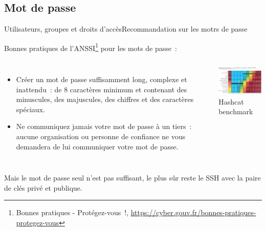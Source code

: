 \documentclass{beamer}
\begin{document}
    \subsection{Mot de passe}\label{subsec:password}
    \begin{frame}{Utilisateurs, groupes et droits d'accès}{Recommandation sur les motrs de passe}
        \begin{footnotesize}
            Bonnes pratiques de l'ANSSI\footnote{Bonnes pratiques - Protégez-vous~!, \url{https://cyber.gouv.fr/bonnes-pratiques-protegez-vous}} pour les mots de passe~:
            \begin{columns}
                \begin{itemize}
                    \item Créer un mot de passe suffisamment long, complexe et inattendu~:
                    de 8 caractères minimum et contenant des minuscules, des majuscules,
                    des chiffres et des caractères spéciaux.

                    \item Ne communiquez jamais votre mot de passe à un tiers~: aucune
                    organisation ou personne de confiance ne vous demandera de lui
                    communiquer votre mot de passe.

                \end{itemize}
                \centering
                \includegraphics[width=6.5cm]{image/real-password-cracking} \\ Hashcat benchmark\footnotemark \\
            \end{columns}
            Mais le mot de passe seul n'est pas suffisant, le plus sûr reste le SSH avec la paire de clés privé et publique.
        \end{footnotesize}
    \end{frame}
\end{document}
